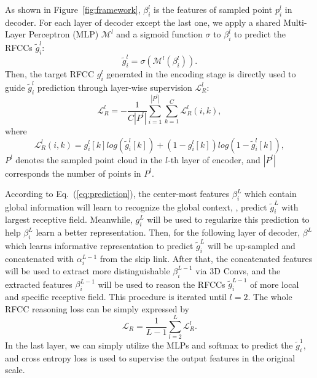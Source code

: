 \documentclass[final]{cvpr}
\begin{document}
As shown in Figure~\ref{fig:framework}, ${\beta}_i^l$ is the features of sampled point $p_i^l$ in decoder. For each layer of decoder except the last one, we apply a shared Multi-Layer Perceptron (MLP) $\mathcal{M}^l$ and a sigmoid function $\sigma$ to ${\beta}_i^l$ to predict the RFCCs $\tilde{g}_i^l$:
\begin{equation}
    \label{eq:prediction}
    \tilde{g}_i^l = \sigma(\mathcal{M}^l({\beta}_i^l)).
\end{equation}
Then, the target RFCC $g_i^l$ generated in the encoding stage is directly used to guide $\tilde{g}_i^l$ prediction through layer-wise supervision $\mathcal{L}_R^l$:
\begin{equation}
    \mathcal{L}_R^l = -\frac{1}{C|P^l|}\sum_{i=1}^{|P^l|}\sum_{k=1}^C \mathcal{L}_R^l(i,k) ,
\end{equation}
where
\begin{equation}
    \mathcal{L}_R^l(i,k) = g_i^l[k]log(\tilde{g}_i^l[k])+ (1-g_i^l[k])log(1-\tilde{g}_i^l[k]),
\end{equation}
$P^l$ denotes the sampled point cloud in the $l$-th layer of encoder, and $|P^l|$ corresponds the number of points in $P^l$.

According to Eq.~(\ref{eq:prediction}), the center-most features $\beta_i^L$ which contain global information will learn to recognize the global context, \ie, predict $\tilde{g}_i^L$ with largest receptive field. Meanwhile, $g_i^L$ will be used to regularize this prediction to help $\beta_i^L$ learn a better representation. Then, for the following layer of decoder, $\beta^L$ which learns informative representation to predict $\tilde{g}_i^{L}$ will be up-sampled and concatenated with ${\alpha}_i^{L-1}$ from the skip link. After that, the concatenated features will be used to extract more distinguishable $\beta_i^{L-1}$ via 3D Convs, and the extracted features $\beta_i^{L-1}$ will be used to reason the RFCCs $\tilde{g}_i^{L-1}$ of more local and specific receptive field. This procedure is iterated until $l=2$. The whole RFCC reasoning loss can be simply expressed by
\begin{equation}
    \mathcal{L}_R = \frac{1}{L-1}\sum_{l=2}^L \mathcal{L}_R^l.
\end{equation}
In the last layer, we can simply utilize the MLPs and softmax to predict the $\tilde{g}_i^1$, and cross entropy loss is used to supervise the output features in the original scale.
\end{document}
